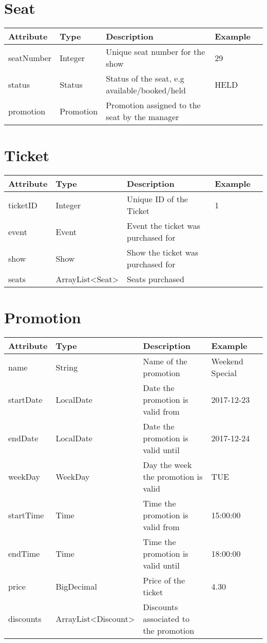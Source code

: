 \section{Seat}
\keepXColumns
\begin{tabularx}{\linewidth}{l l l X l}
  \textbf{Attribute}&\textbf{Type}&\textbf{Description}&\textbf{Example}\\
  \endhead
  seatNumber  & Integer   & Unique seat number for the show               & 29\\
  status      & Status    & Status of the seat, e.g available/booked/held & HELD\\
  promotion   & Promotion & Promotion assigned to the seat by the manager &
\end{tabularx}


\section{Ticket}
\keepXColumns
\begin{tabularx}{\linewidth}{l l l X l}
  \textbf{Attribute}&\textbf{Type}&\textbf{Description}&\textbf{Example}\\
  \endhead
  ticketID  & Integer         & Unique ID of the Ticket             & 1\\
  event     & Event           & Event the ticket was purchased for  &\\
  show      & Show            & Show the ticket was purchased for   &\\
  seats     & ArrayList<Seat> & Seats purchased                     &\\
\end{tabularx}

\section{Promotion}
\keepXColumns
\begin{tabularx}{\linewidth}{l l l X l}
  \textbf{Attribute}&\textbf{Type}&\textbf{Description}&\textbf{Example}\\
  \endhead
  name      & String              & Name of the promotion                 & Weekend Special\\
  startDate & LocalDate           & Date the promotion is valid from      & 2017-12-23\\
  endDate   & LocalDate           & Date the promotion is valid until     & 2017-12-24\\
  weekDay   & WeekDay             & Day the week the promotion is valid   & TUE\\
  startTime & Time                & Time the promotion is valid from      & 15:00:00\\
  endTime   & Time                & Time the promotion is valid until     & 18:00:00\\
  price     & BigDecimal          & Price of the ticket                   & 4.30\\
  discounts & ArrayList<Discount> & Discounts associated to the promotion &
\end{tabularx}

